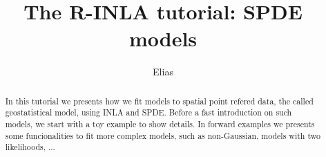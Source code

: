 \documentclass[a4paper,11pt]{report}
\title{The R-INLA tutorial: SPDE models}
\author{Elias}
\begin{document}
\maketitle

\begin{abstract}
    In this tutorial we presents how we fit models to spatial point
    refered data, the called geostatistical model, using INLA and
    SPDE.  Before a fast introduction on such models, we start with a
    toy example to show details.  In forward examples we presents some
    funcionalities to fit more complex models, such as non-Gaussian,
    models with two likelihoods, ...
\end{abstract}

\tableofcontents









\end{document}
